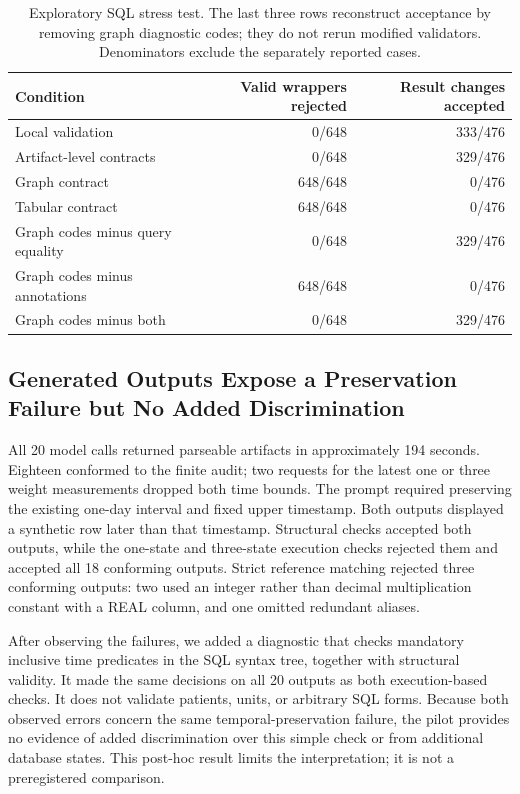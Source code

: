 \documentclass[manuscript,review,anonymous]{acmart}
\begin{document}
\begin{table}[t]
  \caption{Exploratory SQL stress test. The last three rows reconstruct acceptance by removing graph diagnostic codes; they do not rerun modified validators. Denominators exclude the separately reported cases.}
  \label{tab:stress-results}
  \centering
  \small
  \begin{tabular}{lrr}
    \toprule
    Condition & Valid wrappers rejected & Result changes accepted \\
    \midrule
    Local validation & 0/648 & 333/476 \\
    Artifact-level contracts & 0/648 & 329/476 \\
    Graph contract & 648/648 & 0/476 \\
    Tabular contract & 648/648 & 0/476 \\
    Graph codes minus query equality & 0/648 & 329/476 \\
    Graph codes minus annotations & 648/648 & 0/476 \\
    Graph codes minus both & 0/648 & 329/476 \\
    \bottomrule
  \end{tabular}
\end{table}

\subsection{Generated Outputs Expose a Preservation Failure but No Added Discrimination}

All 20 model calls returned parseable artifacts in approximately 194 seconds. Eighteen conformed to the finite audit; two requests for the latest one or three weight measurements dropped both time bounds. The prompt required preserving the existing one-day interval and fixed upper timestamp. Both outputs displayed a synthetic row later than that timestamp. Structural checks accepted both outputs, while the one-state and three-state execution checks rejected them and accepted all 18 conforming outputs. Strict reference matching rejected three conforming outputs: two used an integer rather than decimal multiplication constant with a REAL column, and one omitted redundant aliases.

After observing the failures, we added a diagnostic that checks mandatory inclusive time predicates in the SQL syntax tree, together with structural validity. It made the same decisions on all 20 outputs as both execution-based checks. It does not validate patients, units, or arbitrary SQL forms. Because both observed errors concern the same temporal-preservation failure, the pilot provides no evidence of added discrimination over this simple check or from additional database states. This post-hoc result limits the interpretation; it is not a preregistered comparison.
\end{document}
